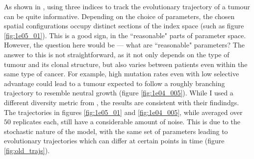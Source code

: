 As shown in \cite{noble_spatial_2022}, using three indices to track the
evolutionary trajectory of a tumour can be quite informative. Depending on the
choice of parameters, the chosen spatial configurations occupy distinct sections
of the index space (such as figure \ref{fig:1e05_01}). This is a good sign, in
the ``reasonable" parts of parameter space. However, the question here would be
--- what are ``reasonable" parameters? The answer to this is not
straightforward, as it not only depends on the type of tumour and its clonal
structure, but also varies between patients even within the same type of
cancer. For example, high mutation rates even with low selective advantage
could lead to a tumour expected to follow a roughly branching trajectory to
resemble neutral growth (figure \ref{fig:1e04_005}). While I used a different
diversity metric from \cite{noble_spatial_2022}, the results are consistent with
their findindgs. The trajectories in figures \ref{fig:1e05_01} and \ref{fig:1e04_005},
while averaged over $50$ replicates each, still have a considerable amount of
noise. This is due to the stochastic nature of the model, with the same set of
parameters leading to evolutionary trajectories which can differ at certain
points in time (figure \ref{fig:old_trajs}).

